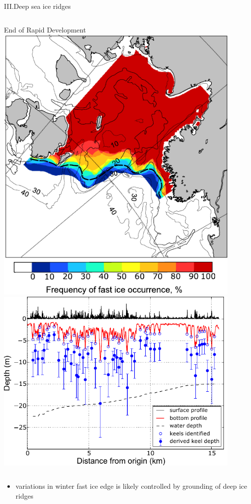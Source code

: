 \documentclass[8pt]{beamer}
\begin{document}
\setwatermark{\fontsize{125pt}{125pt}\selectfont{}}
\begin{frame}[fragile]{III.Deep sea ice ridges}
\begin{columns}
	End of Rapid Development
		\includegraphics[width=0.9\textwidth]{./img/Rgrth_freqency.pdf}
		\includegraphics[width=0.9\textwidth]{./img/EM_profile.pdf}
	\end{columns}
\begin{itemize}
	\item variations in winter fast ice edge is likely controlled by grounding of deep ice ridges
\end{itemize}
\end{frame}
\end{document}
